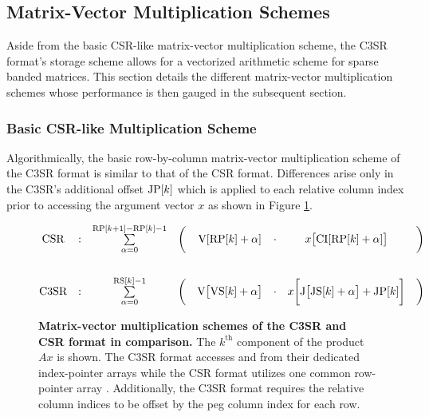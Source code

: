 \documentclass{article}
\begin{document}
  \subsection{Matrix-Vector Multiplication Schemes} \label{subsec:matrix-vector-multiplication-schemes}

    Aside from the basic CSR-like matrix-vector multiplication scheme, the C3SR format's storage scheme allows for a vectorized arithmetic scheme for sparse banded matrices. This section details the different matrix-vector multiplication schemes whose performance is then gauged in the subsequent section.

    \subsubsection{Basic CSR-like Multiplication Scheme} \label{subsubsec:basic-csr-like-multiplication-scheme}

      Algorithmically, the basic row-by-column matrix-vector multiplication scheme of the C3SR format is similar to that of the CSR format. Differences arise only in the C3SR's additional offset $\JP[k]$ which is applied to each relative column index prior to accessing the argument vector $x$ as shown in Figure \ref{fig:c3sr_matvecmult_basic}.

      \begin{figure}[ht]
        \centering
        $$
        \begin{matrix}
          \text{CSR}  & : & \sum \limits_{\alpha = 0}^{\RP[k+1] - \RP[k] - 1} & \bigg( & \V[\RP[k] + \alpha]   & \cdot & x\big[\CI[\RP[k] + \alpha]\big] & \bigg)\\
          \vspace{0.3cm} \\
          \text{C3SR} & : & \sum \limits_{\alpha = 0}^{\RS[k] - 1} & \bigg( & \V\big[\VS[k] + \alpha\big] & \cdot & x\bigg[\J\big[\JS[k] + \alpha\big] + \JP[k]\bigg] & \bigg) \\
        \end{matrix}
        $$
        \caption[Matrix-vector multiplication schemes of the C3SR and CSR format in comparison.]{\textbf{Matrix-vector multiplication schemes of the C3SR and CSR format in comparison.} The $k^{\text{th}}$ component of the product $Ax$ is shown. The C3SR format accesses \V and \J from their dedicated index-pointer arrays while the CSR format utilizes one common row-pointer array \RP. Additionally, the C3SR format requires the relative column indices to be offset by the peg column index for each row.}
        \label{fig:c3sr_matvecmult_basic}
      \end{figure}
\end{document}
